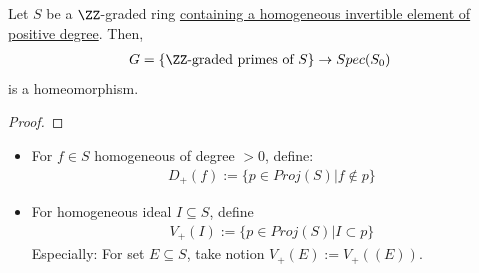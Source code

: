 \documentclass[Total.tex]{subfiles}
\begin{document}
			\begin{lemma}
				Let $S$ be a $\ZZ$-graded ring \underline{containing a homogeneous invertible element of positive degree}. Then, 
				\begin{gather*}
					G=\{\ZZ\mbox{-graded primes of }S\}\rightarrow Spec(S_0)
				\end{gather*}
				is a homeomorphism.
			\end{lemma}
			\begin{proof}
			\end{proof}
			\begin{Def}
				\begin{itemize}
					\item For $f\in S$ homogeneous of degree $>0$, define:
					\begin{gather*}
						D_+(f):=\{p\in Proj(S)|f\notin p\}
					\end{gather*}
					\item For homogeneous ideal $I\subseteq S$, define
					\begin{gather*}
						V_+(I):=\{p\in Proj(S)|I\subset p\}
					\end{gather*}
					Especially: For set $E\subseteq S$, take notion $V_+(E):=V_+((E))$.
				\end{itemize}
			\end{Def}
			
\end{document}
